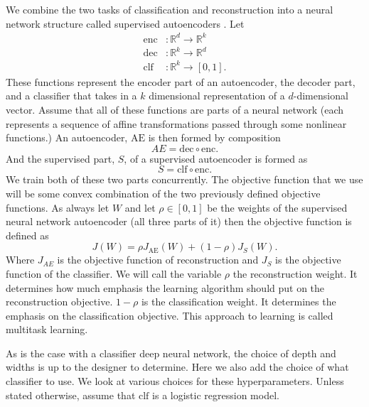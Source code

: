 \documentclass{article}
\begin{document}
We combine the two tasks of classification and reconstruction into a neural network structure called supervised autoencoders \cite{sae}. Let
\begin{align*}
    \mathrm{enc}&:\mathbb{R}^d \longrightarrow \mathbb{R}^k \\
    \mathrm{dec}&:\mathbb{R}^k \longrightarrow \mathbb{R}^d \\
    \mathrm{clf}&:\mathbb{R}^k \longrightarrow [0, 1]. 
\end{align*}
These functions represent the encoder part of an autoencoder, the decoder part, and a classifier that takes in a $k$ dimensional representation of a $d$-dimensional vector. Assume that all of these functions are parts of a neural network (each represents a sequence of affine transformations passed through some nonlinear functions.) An autoencoder, $\mathrm{AE}$ is then formed by composition
\[
AE = \mathrm{dec} \circ \mathrm{enc}.    
\]
And the supervised part, $S$, of a supervised autoencoder is formed as 
\[
S = \mathrm{clf} \circ \mathrm{enc}.
\] 
We train both of these two parts concurrently. The objective function that we use will be some convex combination of the two previously defined objective functions. As always let $W$ and let $\rho \in [0, 1]$ be the weights of the supervised neural network autoencoder (all three parts of it) then the objective function is defined as 
\[
J(W) = \rho J_{\mathrm{AE}}(W) + (1-\rho) J_{S}(W).
\]
Where $J_{AE}$ is the objective function of reconstruction and $J_{S}$ is the objective function of the classifier. We will call the variable $\rho$ the reconstruction weight. It determines how much emphasis the learning algorithm should put on the reconstruction objective. $1-\rho$ is the classification weight. It determines the emphasis on the classification objective. This approach to learning is called multitask learning. 

As is the case with a classifier deep neural network, the choice of depth and widths is up to the designer to determine. Here we also add the choice of what classifier to use. We look at various choices for these hyperparameters. Unless stated otherwise, assume that $\mathrm{clf}$ is a logistic regression model.
\end{document}
